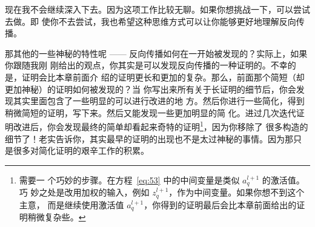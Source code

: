 现在我不会继续深入下去。因为这项工作比较无聊。如果你想挑战一下，可以尝试去做。即
使你不去尝试，我也希望这种思维方式可以让你能够更好地理解反向传播。

那其他的一些神秘的特性呢 —— 反向传播如何在一开始被发现的？实际上，如果你跟随我刚
刚给出的观点，你其实是可以发现反向传播的一种证明的。不幸的是，证明会比本章前面介
绍的证明更长和更加的复杂。那么，前面那个简短（却更加神秘）的证明如何被发现的？当
你写出来所有关于长证明的细节后，你会发现其实里面包含了一些明显的可以进行改进的地
方。然后你进行一些简化，得到稍微简短的证明，写下来。然后又能发现一些更加明显的简
化。进过几次迭代证明改进后，你会发现最终的简单却看起来奇特的证明\footnote{需要一
  个巧妙的步骤。在方程~\eqref{eq:53} 中的中间变量是类似 $a_q^{l+1}$ 的激活值。巧
  妙之处是改用加权的输入，例如 $z^{l+1}_q$，作为中间变量。如果你想不到这个主意，
  而是继续使用激活值
  $a_q^{l+1}$，你得到的证明最后会比本章前面给出的证明稍微复杂些。}，因为你移除了
很多构造的细节了！老实告诉你，其实最早的证明的出现也不是太过神秘的事情。因为那只
是很多对简化证明的艰辛工作的积累。
